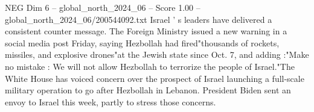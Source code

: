\begin{textsample}{NEG Dim 6 – global\_north\_2024\_06 – Score 1.00 – global\_north\_2024\_06/200544092.txt}
Israel ' s leaders have delivered a consistent counter message.
The Foreign Ministry issued a new warning in a social media post Friday, saying Hezbollah had fired"thousands of rockets, missiles, and explosive drones"at the Jewish state since Oct. 7, and adding :"Make no mistake : We will not allow Hezbollah to terrorize the people of Israel."The White House has voiced concern over the prospect of Israel launching a full-scale military operation to go after Hezbollah in Lebanon.
President Biden sent an envoy to Israel this week, partly to stress those concerns.

\end{textsample}
